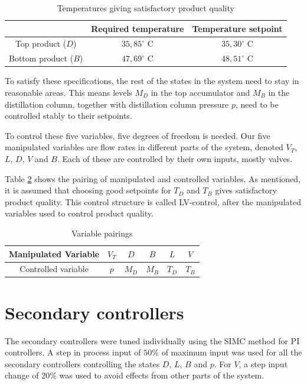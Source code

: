 \documentclass[12pt]{article}
\begin{document}
\begin{table}[h]
\centering
\begin{tabular}{c | c | c }
& Required temperature & Temperature setpoint\\ \hline
Top product ($D$) & $35,85^\circ$ C & $35,30^\circ$ C\\
Bottom product ($B$) & $47,69^\circ$ C & $48,51^\circ$ C
\end{tabular}
\caption{Temperatures giving satisfactory product quality}
\label{tab:requirements}
\end{table}

To satisfy these specifications, the rest of the states in the system need to stay in reasonable areas. This means levels $M_D$ in the top accumulator and $M_B$ in the distillation column, together with distillation column pressure $p$, need to be controlled stably to their setpoints.

To control these five variables, five degrees of freedom is needed. Our five manipulated variables are flow rates in different parts of the system, denoted $V_T$, $L$, $D$, $V$ and $B$. Each of these are controlled by their own inputs, mostly valves.

Table \ref{tab:pairings} shows the pairing of manipulated and controlled variables. As mentioned, it is assumed that choosing good setpoints for $T_D$ and $T_B$ gives satisfactory product quality. This control structure is called LV-control, after the manipulated variables used to control product quality.

\begin{table}[h]
\centering
\begin{tabular}{c|ccccc}
Manipulated Variable & $V_T$ & $D$ & $B$ & $L$ & $V$ \\ \hline
Controlled variable & $p$ & $M_D$ & $M_B$ & $T_D$ & $T_B$
\end{tabular}

\caption{Variable pairings}
\label{tab:pairings}
\end{table}

\newpage
\section{Secondary controllers}
The secondary controllers were tuned individually using the SIMC method for PI controllers. A step in process input of $50\%$ of maximum input was used for all the secondary controllers controlling the states $D$, $L$, $B$ and $p$. For $V$, a step input change of $20\%$ was used to avoid effects from other parts of the system.
\end{document}

